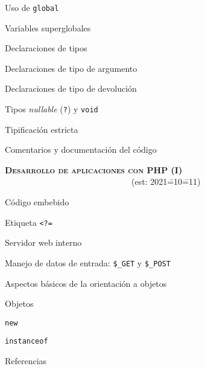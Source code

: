 \begin{longenum}
\begin{longenum}
\begin{longenum}
\begin{longenum}
                \item Uso de \texttt{global}
                \item Variables superglobales
            \end{longenum}
            \item Declaraciones de tipos
            \begin{longenum}
                \item Declaraciones de tipo de argumento
                \item Declaraciones de tipo de devolución
                \item Tipos \textit{nullable} (\texttt{?}) y \texttt{void}
                \item Tipificación estricta
            \end{longenum}
        \end{longenum}
        \item Comentarios y documentación del código
    \end{longenum}
    \item \textbf{\textsc{Desarrollo de aplicaciones con PHP (I)}} \ \ \ \ \ \ \ \ \ \ \ \ \ \ \ \ \ \ \ \ \ \ \ \ \ \ \ \ \ \ (est: 2021\==10\==11)
    \begin{longenum}
        \item Código embebido
        \begin{longenum}
            \item Etiqueta \texttt{<?=}
            \item Servidor web  interno
        \end{longenum}
        \item Manejo de datos de entrada: \texttt{\$\_GET} y \texttt{\$\_POST}
        \item Aspectos básicos de la orientación a objetos
        \begin{longenum}
            \item Objetos
            \begin{longenum}
                \item \texttt{new}
                \item \texttt{instanceof}
            \end{longenum}
            \item Referencias
            \begin{longenum}

\end{longenum}
\end{longenum}
\end{longenum}
\end{longenum}
